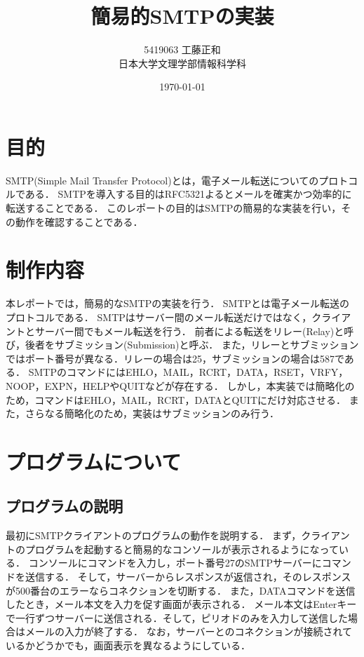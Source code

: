 \documentclass[dvipdfmx,a4paper]{jsarticle}
\title{簡易的SMTPの実装}
\author{5419063 工藤正和\\日本大学文理学部情報科学科}
\date{\today}
\theoremstyle{definition}
\begin{document}
\maketitle

\begin{abstract}
  

\end{abstract}

\section{目的}
SMTP(Simple Mail Transfer Protocol)とは，電子メール転送についてのプロトコルである．
SMTPを導入する目的はRFC5321よるとメールを確実かつ効率的に転送することである．
このレポートの目的はSMTPの簡易的な実装を行い，その動作を確認することである．


\section{制作内容}
  本レポートでは，簡易的なSMTPの実装を行う．
  SMTPとは電子メール転送のプロトコルである．
  SMTPはサーバー間のメール転送だけではなく，クライアントとサーバー間でもメール転送を行う．
  前者による転送をリレー(Relay)と呼び，後者をサブミッション(Submission)と呼ぶ．
  また，リレーとサブミッションではポート番号が異なる．リレーの場合は25，サブミッションの場合は587である．
  SMTPのコマンドにはEHLO，MAIL，RCRT，DATA，RSET，VRFY，NOOP，EXPN，HELPやQUITなどが存在する．
  しかし，本実装では簡略化のため，コマンドはEHLO，MAIL，RCRT，DATAとQUITにだけ対応させる．
  また，さらなる簡略化のため，実装はサブミッションのみ行う．

\section{プログラムについて}
\subsection{プログラムの説明}
最初にSMTPクライアントのプログラムの動作を説明する．
まず，クライアントのプログラムを起動すると簡易的なコンソールが表示されるようになっている．
コンソールにコマンドを入力し，ポート番号27のSMTPサーバーにコマンドを送信する．
そして，サーバーからレスポンスが返信され，そのレスポンスが500番台のエラーならコネクションを切断する．
また，DATAコマンドを送信したとき，メール本文を入力を促す画面が表示される．
メール本文はEnterキーで一行ずつサーバーに送信される．そして，ピリオドのみを入力して送信した場合はメールの入力が終了する．
なお，サーバーとのコネクションが接続されているかどうかでも，画面表示を異なるようにしている．
\end{document}
